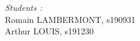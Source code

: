 \begin{titlepage}
\begin{minipage}{0.4\textwidth}
 		\begin{flushright} \large
 		\emph{Students :} \\
        Romain LAMBERMONT, s190931\\
        Arthur LOUIS, s191230\\
      
 	\end{flushright}

 \end{minipage}\\[2 cm]

 \thedate
\end{titlepage}

\thispagestyle{empty}
\tableofcontents
\listoffigures
\listoftables
\pagebreak
\setcounter{page}{1}